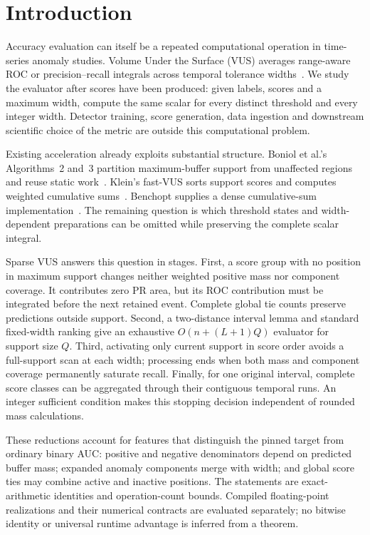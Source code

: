 \section{Introduction}
Accuracy evaluation can itself be a repeated computational operation in
time-series anomaly studies. Volume Under the Surface (VUS) averages
range-aware ROC or precision--recall integrals across temporal tolerance
widths~\cite{paparrizos2022,boniol2025}. We study the evaluator after scores
have been produced: given labels, scores and a maximum width, compute the
same scalar for every distinct threshold and every integer width. Detector
training, score generation, data ingestion and downstream scientific choice
of the metric are outside this computational problem.

Existing acceleration already exploits substantial structure. Boniol
et al.'s Algorithms~2 and~3 partition maximum-buffer support from unaffected
regions and reuse static work~\cite{boniol2025}. Klein's fast-VUS sorts
support scores and computes weighted cumulative sums~\cite{klein2026}.
Benchopt supplies a dense cumulative-sum implementation~\cite{benchopt2026}.
The remaining question is which threshold states and width-dependent
preparations can be omitted while preserving the complete scalar integral.

Sparse VUS answers this question in stages. First, a score group with no
position in maximum support changes neither weighted positive mass nor
component coverage. It contributes zero PR area, but its ROC contribution
must be integrated before the next retained event. Complete global tie
counts preserve predictions outside support. Second, a two-distance
interval lemma and standard fixed-width ranking give an exhaustive
$O(n+(L+1)Q)$ evaluator for support size $Q$. Third, activating only current
support in score order avoids a full-support scan at each width; processing
ends when both mass and component coverage permanently saturate recall.
Finally, for one original interval, complete score classes can be aggregated
through their contiguous temporal runs. An integer sufficient condition
makes this stopping decision independent of rounded mass calculations.

These reductions account for features that distinguish the pinned target
from ordinary binary AUC: positive and negative denominators depend on
predicted buffer mass; expanded anomaly components merge with width; and
global score ties may combine active and inactive positions. The statements
are exact-arithmetic identities and operation-count bounds. Compiled
floating-point realizations and their numerical contracts are evaluated
separately; no bitwise identity or universal runtime advantage is inferred
from a theorem.

